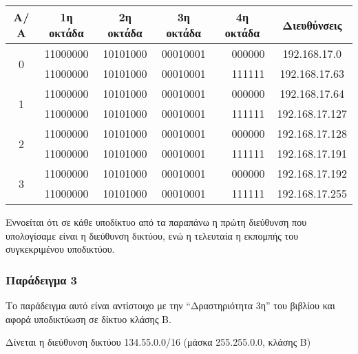 \begin{center}
\fontsize{10}{12}
\ttfamily
\begin{tabular}{|c|c|c|c|c|c|c|}
\hline
                Α/Α  & 1η οκτάδα  & 2η οκτάδα  & 3η οκτάδα  & \multicolumn{2}{c|}{ 4η οκτάδα }  & Διευθύνσεις \\ \hline

\multirow{2}{*}{0} & 11000000 & 10101000 & 00010001 & \multirow{2}{*}{\colorbox{red}{\color{white}{00}}}  & 000000 & 192.168.17.0 \\ \cline{2-4} \cline{6-7} 
                  & 11000000 & 10101000 & 00010001 &                    & 111111 & 192.168.17.63  \\ \hline

\multirow{2}{*}{1} & 11000000  & 10101000 & 00010001  & \multirow{2}{*}{\colorbox{red}{\color{white}{01}}}  & 000000  & 192.168.17.64 \\ \cline{2-4} \cline{6-7} 
                  & 11000000 & 10101000 & 00010001 &                    & 111111 & 192.168.17.127 \\ \hline
\multirow{2}{*}{2} & 11000000  & 10101000  & 00010001 & \multirow{2}{*}{\colorbox{red}{\color{white}{10}}}  & 000000 & 192.168.17.128 \\ \cline{2-4} \cline{6-7} 
                  & 11000000 & 10101000  & 00010001 &                    & 111111 & 192.168.17.191 \\ \hline
\multirow{2}{*}{3} & 11000000  & 10101000 & 00010001  & \multirow{2}{*}{\colorbox{red}{\color{white}{11}}}  & 000000 & 192.168.17.192 \\ \cline{2-4} 
\cline{6-7} 
                  & 11000000 & 10101000  & 00010001 &                    & 111111 & 192.168.17.255 \\ \hline
\end{tabular}
\normalfont
\end{center}

Εννοείται ότι σε κάθε υποδίκτυο από τα παραπάνω η πρώτη διεύθυνση που υπολογίσαμε είναι η διεύθυνση δικτύου, ενώ η τελευταία η εκπομπής του συγκεκριμένου υποδικτύου.

\subsubsection*{Παράδειγμα 3}

Το παράδειγμα αυτό είναι αντίστοιχο με την ``Δραστηριότητα 3η'' του βιβλίου και αφορά υποδικτύωση σε δίκτυο κλάσης B.

Δίνεται η διεύθυνση δικτύου 134.55.0.0/16 (μάσκα 255.255.0.0, κλάσης B)

